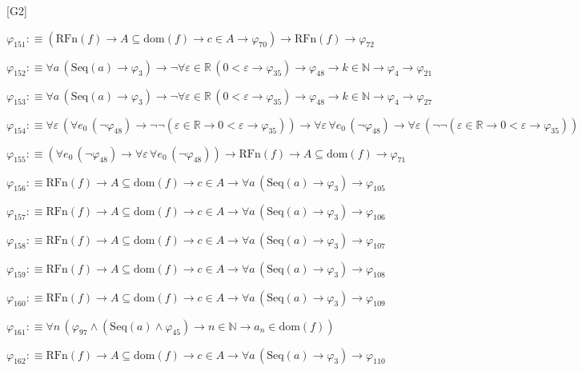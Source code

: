 \begin{fullproof}{[G2]}
\begin{abbrevlist}
\item $\varphi_{151} :\equiv (\mathrm{RFn}(f) \to A \subseteq \mathrm{dom}(f) \to c \in A \to \varphi_{70}) \to \mathrm{RFn}(f) \to \varphi_{72}$
\item $\varphi_{152} :\equiv \forall a\,(\mathrm{Seq}(a) \to \varphi_{3}) \to \neg \forall \varepsilon \in \mathbb{R}\,(0 < \varepsilon \to \varphi_{35}) \to \varphi_{48} \to k \in \mathbb{N} \to \varphi_{4} \to \varphi_{21}$
\item $\varphi_{153} :\equiv \forall a\,(\mathrm{Seq}(a) \to \varphi_{3}) \to \neg \forall \varepsilon \in \mathbb{R}\,(0 < \varepsilon \to \varphi_{35}) \to \varphi_{48} \to k \in \mathbb{N} \to \varphi_{4} \to \varphi_{27}$
\item $\varphi_{154} :\equiv \forall \varepsilon\,(\forall e_{0}\,(\neg \varphi_{48}) \to \neg \neg (\varepsilon \in \mathbb{R} \to 0 < \varepsilon \to \varphi_{35})) \to \forall \varepsilon\,\forall e_{0}\,(\neg \varphi_{48}) \to \forall \varepsilon\,(\neg \neg (\varepsilon \in \mathbb{R} \to 0 < \varepsilon \to \varphi_{35}))$
\item $\varphi_{155} :\equiv (\forall e_{0}\,(\neg \varphi_{48}) \to \forall \varepsilon\,\forall e_{0}\,(\neg \varphi_{48})) \to \mathrm{RFn}(f) \to A \subseteq \mathrm{dom}(f) \to \varphi_{71}$
\item $\varphi_{156} :\equiv \mathrm{RFn}(f) \to A \subseteq \mathrm{dom}(f) \to c \in A \to \forall a\,(\mathrm{Seq}(a) \to \varphi_{3}) \to \varphi_{105}$
\item $\varphi_{157} :\equiv \mathrm{RFn}(f) \to A \subseteq \mathrm{dom}(f) \to c \in A \to \forall a\,(\mathrm{Seq}(a) \to \varphi_{3}) \to \varphi_{106}$
\item $\varphi_{158} :\equiv \mathrm{RFn}(f) \to A \subseteq \mathrm{dom}(f) \to c \in A \to \forall a\,(\mathrm{Seq}(a) \to \varphi_{3}) \to \varphi_{107}$
\item $\varphi_{159} :\equiv \mathrm{RFn}(f) \to A \subseteq \mathrm{dom}(f) \to c \in A \to \forall a\,(\mathrm{Seq}(a) \to \varphi_{3}) \to \varphi_{108}$
\item $\varphi_{160} :\equiv \mathrm{RFn}(f) \to A \subseteq \mathrm{dom}(f) \to c \in A \to \forall a\,(\mathrm{Seq}(a) \to \varphi_{3}) \to \varphi_{109}$
\item $\varphi_{161} :\equiv \forall n\,(\varphi_{97} \land (\mathrm{Seq}(a) \land \varphi_{45}) \to n \in \mathbb{N} \to a_{n} \in \mathrm{dom}(f))$
\item $\varphi_{162} :\equiv \mathrm{RFn}(f) \to A \subseteq \mathrm{dom}(f) \to c \in A \to \forall a\,(\mathrm{Seq}(a) \to \varphi_{3}) \to \varphi_{110}$

\end{abbrevlist}
\end{fullproof}
